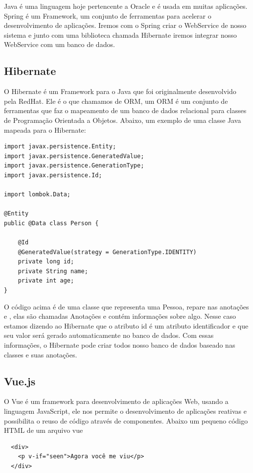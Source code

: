 \documentclass[12pt]{article}
\begin{document}
Java é uma linguagem hoje pertencente a Oracle e é usada em muitas aplicações.
Spring é um Framework, um conjunto de ferramentas para acelerar o desenvolvimento de aplicações.
Iremos com o Spring criar o WebService de nosso sistema e junto com uma biblioteca chamada Hibernate
iremos integrar nosso WebService com um banco de dados.

\subsection{Hibernate}

O Hibernate é um Framework para o Java que foi originalmente desenvolvido pela RedHat.
Ele é o que chamamos de ORM, um ORM é um conjunto de ferramentas que faz o mapeamento
de um banco de dados relacional para classes de Programação Orientada a Objetos.
Abaixo, um exemplo de uma classe Java mapeada para o Hibernate:

\begin{verbatim}
import javax.persistence.Entity;
import javax.persistence.GeneratedValue;
import javax.persistence.GenerationType;
import javax.persistence.Id;

import lombok.Data;

@Entity
public @Data class Person {

    @Id
    @GeneratedValue(strategy = GenerationType.IDENTITY)
    private long id;
    private String name;
    private int age;
}
\end{verbatim}

O código acima é de uma classe que representa uma Pessoa, repare nas anotações
\@Id e \@GeneratedValue, elas são chamadas Anotações e contém informações sobre algo.
Nesse caso estamos dizendo ao Hibernate que o atributo id é um atributo identificador
e que seu valor será gerado automaticamente no banco de dados. Com essas informações, o
Hibernate pode criar todos nosso banco de dados baseado nas classes e suas anotações.

\subsection{Vue.js}

O Vue é um framework para desenvolvimento de aplicações Web, usando a linguagem JavaScript,
ele nos permite o desenvolvimento de aplicações reativas e possibilita o reuso
de código através de componentes. Abaixo um pequeno código HTML de um arquivo vue

\begin{verbatim}
  <div>
    <p v-if="seen">Agora você me viu</p>
  </div>
\end{verbatim}
\end{document}
